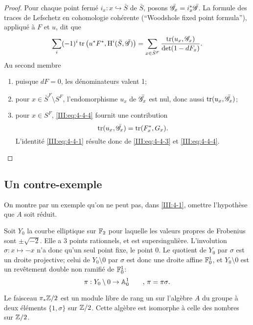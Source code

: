 \begin{proof}
Pour chaque point fermé $i_x:x\hookrightarrow \bar  S$ de $\bar S$, posons 
$\bar{\mathscr{G}}_x = i_x^*\bar{\mathscr{G}}$. La formule des traces de Lefschetz en cohomologie 
cohérente (``Woodshole fixed point formula''), appliqué à $F$ et $u$, dit 
que 
\begin{equation}\label{III:eq:4-4-4}
  \sum_i (-1)^i \operatorname{tr}\left(u^* F^*, \operatorname{H}^i(\bar S,\bar{\mathscr{G}})\right) = \sum_{x\in \bar S^F} \frac{\operatorname{tr}(u_x,\mathscr{G}_x)}{\det(1-d F_x)} \text{.}
\end{equation}
Au second membre
\begin{enumerate}[\indent a)]
  \item puisque $d F=0$, les dénominateurs valent 1;
  \item pour $x\in \bar S^F\setminus S^F$, l'endomorphisme $u_x$ de $\bar{\mathscr{G}}_x$ 
    est nul, donc aussi $\operatorname{tr}(u_x,\bar{\mathscr{G}}_x)$;
  \item pour $x\in S^F$, \eqref{III:eq:4-4-4} fournit une contribution 
    \[
      \operatorname{tr}(u_x,\bar{\mathscr{G}}_x) = \operatorname{tr}(F_x^*,G_x) \text{.}
    \]
    L'identité \eqref{III:eq:4-4-1} résulte donc de \eqref{III:eq:4-4-3} 
    et \eqref{III:eq:4-4-4}. 
\end{enumerate}
\end{proof}





\subsection{Un contre-exemple}\label{III:4-5}

On montre par un exemple qu'on ne peut pas, dans \ref{III:4-1}, omettre 
l'hypothèse que $A$ soit réduit.

Soit $Y_0$ la courbe elliptique sur $\mathbb{F}_2$ pour laquelle les valeurs propres 
de Frobenius sont $\pm \sqrt{-2}$. Elle a $3$ points rationnels, et est 
supersingulière. L'involution $\sigma:x\mapsto -x$ n'a donc qu'un seul point 
fixe, le point $0$. Le quotient de $Y_0$ par $\sigma$ est un droite projective; 
celui de $Y_0\setminus 0$ par $\sigma$ est donc une droite affine $\mathbb{F}_0^1$, et 
$Y_0\setminus 0$ est un revêtement double non ramifié de $\mathbb{F}_0^1$:
\[
  \pi:Y_0\setminus 0 \to \mathbb{A}_0^1 \qquad \text{, $\pi=\pi\sigma$.}
\]

Le faisceau $\pi_*\mathbb{Z}/2$ est un module libre de rang un sur l'algèbre $A$ du 
groupe à deux éléments $\{1,\sigma\}$ sur $\mathbb{Z}/2$. Cette algèbre est 
isomorphe à celle des nombres sur $\mathbb{Z}/2$. 

